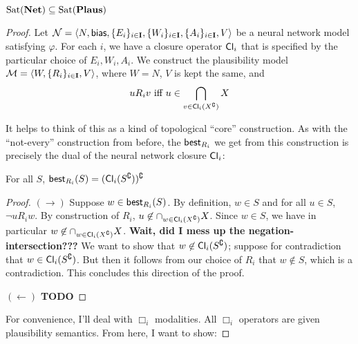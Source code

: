 \documentclass[letterpaper]{article}
\begin{document}
\begin{proposition}
    $\mathrm{Sat}( \textrm{\textbf{Net}} ) \subseteq \mathrm{Sat}( \textrm{\textbf{Plaus}} )$
\end{proposition}
\begin{proof}
    Let $\mathcal{N} = \langle N, \mathsf{bias}, \{ E_i \}_{i \in \textbf{I}}, \{ W_i \}_{i \in \textbf{I}}, \{ A_i \}_{i \in \textbf{I}}, V \rangle$ be a neural network model satisfying $\varphi$.  For each $i$, we have a closure operator $\mathsf{Cl}_i$ that is specified by the particular choice of $E_i, W_i, A_i$.  We construct the plausibility model $\mathcal{M} = \langle W, \{ R_i \}_{i \in \textbf{I}}, V \rangle$, where $W = N$, $V$ is kept the same, and
    \[ u{R_i}v \mbox{ iff } u \in \bigcap_{v \in \mathsf{Cl}_i(X^\complement)}X \]
    
    It helps to think of this as a kind of topological ``core'' construction.  As with the ``not-every'' construction from before, the $\mathsf{best}_{R_i}$ we get from this construction is precisely the dual of the neural network closure $\mathsf{Cl}_i$:
    \begin{claim*}
        For all $S$, $\mathsf{best}_{R_i}(S) = (\mathsf{Cl}_i(S^\complement))^\complement$
    \end{claim*}
    \begin{proof}
        $(\rightarrow)$ Suppose $w \in \mathsf{best}_{R_i}(S)$. By definition, $w \in S$ and for all $u \in S$, $\neg u{R_i}w$.  By construction of $R_i$, $u \not \in \cap_{w \in \mathsf{Cl}_i(X^\complement)}X$.  Since $w \in S$, we have in particular $w \not \in \cap_{w \in \mathsf{Cl}_i(X^\complement)}X$.  \textbf{Wait, did I mess up the negation-intersection???}  We want to show that $w \not \in \mathsf{Cl}_i(S^\complement)$; suppose for contradiction that $w \in \mathsf{Cl}_i(S^\complement)$.  But then it follows from our choice of $R_i$ that $w \not \in S$, which is a contradiction.  This concludes this direction of the proof.
    
        $(\leftarrow)$ \textbf{TODO}
    \end{proof}
    For convenience, I'll deal with $\Box_i$ modalities.  All $\Box_i$ operators are given plausibility semantics.  From here, I want to show:
    

\end{proof}
\end{document}
